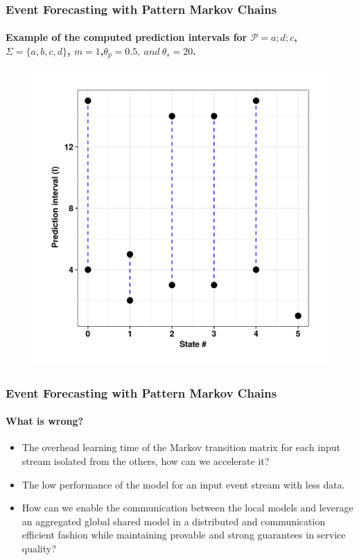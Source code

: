 \frame
{
	\frametitle{Event Forecasting with Pattern Markov
		Chains}
	\framesubtitle{Example of the computed prediction intervals for
		$\mathcal{P}=a ; d ; c$, $\Sigma=\{a,b,c,d\}$, $m=1$,$\theta_{p}=0.5,\ and\ \theta_{s}=20$.}
	
	\begin{figure}[]
		\begin{centering}
			\center
			\includegraphics[width=.9\textwidth,height=.8\textheight]{../chapters/figures/new_prediction_intervals.png}
			
		\end{centering}
	\end{figure}
	
}


\frame
{
	\frametitle{Event Forecasting with Pattern Markov
		Chains}
	\framesubtitle{What is wrong?}
	\begin{itemize}
		
		\item<only@1> The overhead learning time of the Markov transition matrix for each input stream isolated from the others, how can we accelerate it?  
		 
		\item<only@1> The low performance of the model for an input event stream with less data. 
		
			\item<only@1> How can we enable the communication between the local models 
			 and leverage an aggregated global shared model in 
		 	a distributed and communication efficient fashion while maintaining
			provable and strong guarantees in service quality?
			
	
	\end{itemize}
}
